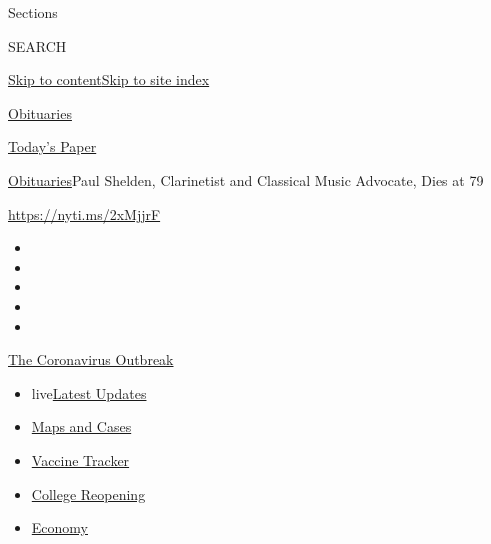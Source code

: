 Sections

SEARCH

\protect\hyperlink{site-content}{Skip to
content}\protect\hyperlink{site-index}{Skip to site index}

\href{https://www.nytimes.com/section/obituaries}{Obituaries}

\href{https://myaccount.nytimes.com/auth/login?response_type=cookie\&client_id=vi}{}

\href{https://www.nytimes.com/section/todayspaper}{Today's Paper}

\href{/section/obituaries}{Obituaries}\textbar{}Paul Shelden,
Clarinetist and Classical Music Advocate, Dies at 79

\url{https://nyti.ms/2xMjjrF}

\begin{itemize}
\item
\item
\item
\item
\item
\end{itemize}

\href{https://www.nytimes.com/news-event/coronavirus?action=click\&pgtype=Article\&state=default\&region=TOP_BANNER\&context=storylines_menu}{The
Coronavirus Outbreak}

\begin{itemize}
\tightlist
\item
  live\href{https://www.nytimes.com/2020/08/03/world/coronavirus-covid-19.html?action=click\&pgtype=Article\&state=default\&region=TOP_BANNER\&context=storylines_menu}{Latest
  Updates}
\item
  \href{https://www.nytimes.com/interactive/2020/us/coronavirus-us-cases.html?action=click\&pgtype=Article\&state=default\&region=TOP_BANNER\&context=storylines_menu}{Maps
  and Cases}
\item
  \href{https://www.nytimes.com/interactive/2020/science/coronavirus-vaccine-tracker.html?action=click\&pgtype=Article\&state=default\&region=TOP_BANNER\&context=storylines_menu}{Vaccine
  Tracker}
\item
  \href{https://www.nytimes.com/2020/08/02/us/covid-college-reopening.html?action=click\&pgtype=Article\&state=default\&region=TOP_BANNER\&context=storylines_menu}{College
  Reopening}
\item
  \href{https://www.nytimes.com/live/2020/08/03/business/stock-market-today-coronavirus?action=click\&pgtype=Article\&state=default\&region=TOP_BANNER\&context=storylines_menu}{Economy}
\end{itemize}

